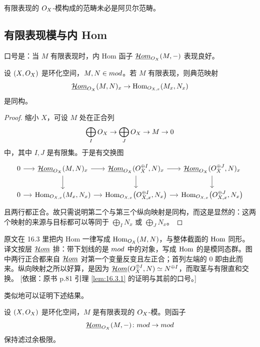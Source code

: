 \begin{warning}\label{warn:16.2.6}
有限表现的 $O_X$-模构成的范畴未必是阿贝尔范畴。
\end{warning}

\subsection{有限表现模与内 Hom}\label{sec:16.3}

口号是：当 $M$ 有限表现时，内 Hom 函子 $\underline{\mathcal{H}om}_{O_X}(M,-)$ 表现良好。

\begin{lemma}\label{lem:16.3.1}
设 $(X,O_X)$ 是环化空间，$M,N\in mod$。若 $M$ 有限表现，则典范映射
\[
\underline{\mathcal{H}om}_{O_X}(M,N)_x\to\operatorname{Hom}_{O_{X,x}}(M_x,N_x)
\]
是同构。
\end{lemma}

\begin{proof}
缩小 $X$，可设 $M$ 处在正合列
\[
\bigoplus_{I}O_X\to\bigoplus_{J}O_X\to M\to 0
\]
中，其中 $I,J$ 是有限集。于是有交换图
\[
\begin{tikzcd}[column sep=small]
0 \arrow[r] & \cHom_{\cO_X}(M,N)_x \arrow[r] \arrow[d] & \cHom_{\cO_X}(\cO_X^{\oplus I},N)_x \arrow[r] \arrow[d] & \cHom_{\cO_X}(\cO_X^{\oplus J},N)_x \arrow[d] \\
0 \arrow[r] & \Hom_{\cO_{X,x}}(M_x,N_x) \arrow[r] & \Hom_{\cO_{X,x}}\bigl(\cO_{X,x}^{\oplus I},N_x\bigr) \arrow[r] & \Hom_{\cO_{X,x}}\bigl(\cO_{X,x}^{\oplus J},N_x\bigr)
\end{tikzcd}
\]
且两行都正合。故只需说明第二个与第三个纵向映射是同构，而这是显然的：这两个映射的来源与目标都可以等同于 $\bigoplus_I N_x$ 或 $\bigoplus_J N_x$。
\end{proof}

\begin{yizhu}
原文在 16.3 里把内 Hom 一律写成 $\operatorname{Hom}_{O_X}(M,N)$，与整体截面的 $\operatorname{Hom}$ 同形。译文按层 $\underline{\mathcal{H}om}$ 排：带下划线的是 $mod$ 中的对象，写成 $\operatorname{Hom}$ 的是模同态群。图中两行正合都来自 $\underline{\mathcal{H}om}$ 对第一个变量反变且左正合；首列左端的 $0$ 即由此而来。纵向映射之所以好算，是因为 $\underline{\mathcal{H}om}(O_X^{\oplus I},N)\simeq N^{\oplus I}$，而取茎与有限直和交换。
[依据：原书 p.81 引理 \ref{lem:16.3.1} 的证明与其前的口号。]
\end{yizhu}

类似地可以证明下述结果。

\begin{lemma}\label{lem:16.3.2}
设 $(X,O_X)$ 是环化空间，$M$ 是有限表现的 $O_X$-模。则函子
\[
\underline{\mathcal{H}om}_{O_X}(M,-)\colon mod\to mod
\]
保持滤过余极限。
\end{lemma}

